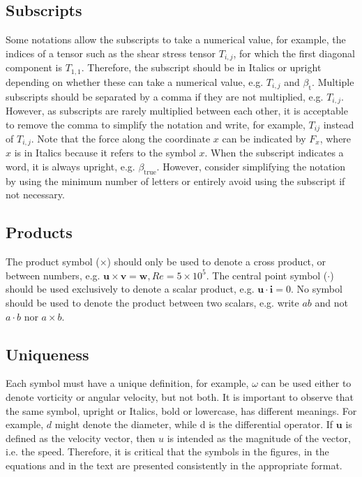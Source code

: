 \documentclass[oneside, a4paper, onecolumn, 11pt]{article}
\begin{document}
\subsection{Subscripts}

Some notations allow the subscripts to take a numerical value, for example, the indices of a tensor such as the shear stress tensor $T_{i,j}$, for which the first diagonal component is $T_{1,1}$. Therefore, the subscript should be in Italics or upright depending on whether these can take a numerical value, e.g. $T_{i,j}$ and $\beta_\text{t}$. Multiple subscripts should be separated by a comma if they are not multiplied, e.g. $T_{i,j}$. However, as subscripts are rarely multiplied between each other, it is acceptable to remove the comma to simplify the notation and write, for example, $T_{ij}$ instead of $T_{i,j}$. Note that the force along the coordinate $x$ can be indicated by $F_x$, where $x$ is in Italics because it refers to the symbol $x$. When the subscript indicates a word, it is always upright, e.g. $\beta_\mathrm{true}$. However, consider simplifying the notation by using the minimum number of letters or entirely avoid using the subscript if not necessary. 

\subsection{Products}

The product symbol ($\times$) should only be used to denote a cross product, or between numbers, e.g. $\bm{u}\times \bm{v}=\bm{w}, Re=5\times 10^5.$ The central point symbol ($\cdot$) should be used exclusively to denote a scalar product, e.g. $\bm{u}\cdot \bm{i}=0$. No symbol should be used to denote the product between two scalars, e.g. write $ab$ and not $a\cdot b$ nor $a\times b$.

\subsection{Uniqueness}

Each symbol must have a unique definition, for example, $\omega$ can be used either to denote vorticity or angular velocity, but not both. It is important to observe that the same symbol, upright or Italics, bold or lowercase, has different meanings. For example, $d$ might denote the diameter, while d is the differential operator. If $\bm{u}$ is defined as the velocity vector, then $u$ is intended as the magnitude of the vector, i.e. the speed. Therefore, it is critical that the symbols in the figures, in the equations and in the text are presented consistently in the appropriate format.  
\end{document}
